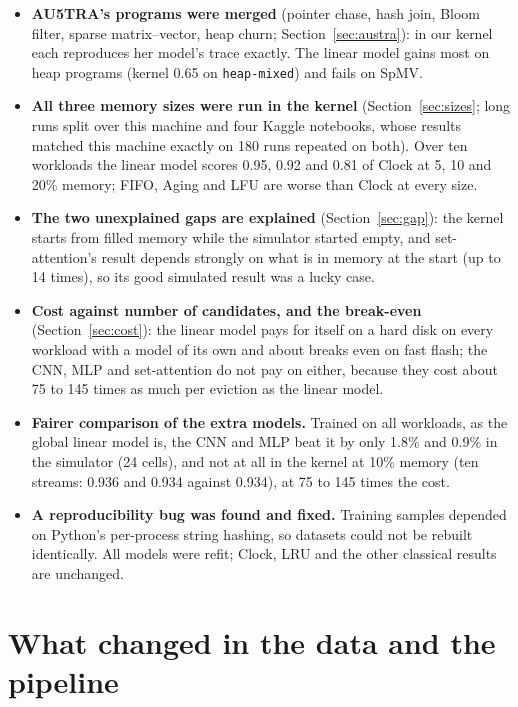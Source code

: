 \documentclass[10.5pt,a4paper]{article}
\newcommand{\code}[1]{\texttt{#1}}
\begin{document}
\begin{itemize}
  (1.7 and 2.9 million instructions against 19\,000); boosted trees equal it at 21 times; on graph the linear model is clearly
  better. Timing is repeatable to under 0.3\% because QEMU's clock is driven by instruction count.
\item \textbf{AU5TRA's programs were merged} (pointer chase, hash join, Bloom filter, sparse matrix--vector, heap churn; Section~\ref{sec:austra}): in our
  kernel each reproduces her model's trace exactly. The linear model gains most on heap programs (kernel 0.65 on \code{heap-mixed}) and fails on SpMV.
\item \textbf{All three memory sizes were run in the kernel} (Section~\ref{sec:sizes}; long runs split over this machine and four Kaggle notebooks, whose results matched this machine
  exactly on 180 runs repeated on both). Over ten workloads the linear model scores 0.95, 0.92 and 0.81 of Clock at 5, 10 and 20\% memory;
  FIFO, Aging and LFU are worse than Clock at every size.
\item \textbf{The two unexplained gaps are explained} (Section~\ref{sec:gap}): the kernel starts from filled memory while the simulator started empty, and set-attention's result
  depends strongly on what is in memory at the start (up to 14 times), so its good simulated result was a lucky case.
\item \textbf{Cost against number of candidates, and the break-even} (Section~\ref{sec:cost}): the linear model pays for itself on a hard disk on every workload with
  a model of its own and about breaks even on fast flash; the CNN, MLP and set-attention do not pay on either, because they cost about 75 to 145 times as much per eviction as the linear model.
\item \textbf{Fairer comparison of the extra models.} Trained on all workloads, as the global linear model is, the CNN and MLP beat it by only 1.8\% and 0.9\% in the simulator (24 cells), and not at all in the kernel at 10\% memory (ten streams: 0.936 and 0.934 against 0.934), at 75 to 145 times the cost.
\item \textbf{A reproducibility bug was found and fixed.} Training samples depended on Python's per-process
  string hashing, so datasets could not be rebuilt identically. All models were refit; Clock, LRU and
  the other classical results are unchanged.
\end{itemize}

\section{What changed in the data and the pipeline}
\end{document}
